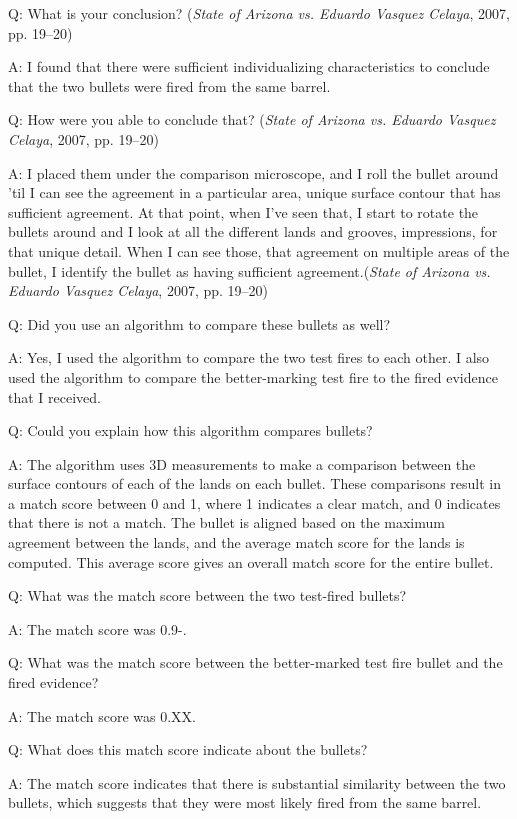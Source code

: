 \documentclass[print]{nuthesis}
\begin{document}
Q: What is your conclusion? (\emph{State of {Arizona} vs. Eduardo {Vasquez} {Celaya}}, 2007, pp. 19--20)

A: I found that there were sufficient individualizing characteristics to conclude that the two bullets were fired from the same barrel.

Q: How were you able to conclude that? (\emph{State of {Arizona} vs. Eduardo {Vasquez} {Celaya}}, 2007, pp. 19--20)

A: I placed them under the comparison microscope, and I roll the bullet around 'til I can see the agreement in a particular area, unique surface contour that has sufficient agreement.
At that point, when I've seen that, I start to rotate the bullets around and I look at all the different lands and grooves, impressions, for that unique detail.
When I can see those, that agreement on multiple areas of the bullet, I identify the bullet as having sufficient agreement.(\emph{State of {Arizona} vs. Eduardo {Vasquez} {Celaya}}, 2007, pp. 19--20)

Q: Did you use an algorithm to compare these bullets as well?

A: Yes, I used the algorithm to compare the two test fires to each other.
I also used the algorithm to compare the better-marking test fire to the fired evidence that I received.

Q: Could you explain how this algorithm compares bullets?

A: The algorithm uses 3D measurements to make a comparison between the surface contours of each of the lands on each bullet.
These comparisons result in a match score between 0 and 1, where 1 indicates a clear match, and 0 indicates that there is not a match.
The bullet is aligned based on the maximum agreement between the lands, and the average match score for the lands is computed.
This average score gives an overall match score for the entire bullet.

Q: What was the match score between the two test-fired bullets?

A: The match score was 0.9-.

Q: What was the match score between the better-marked test fire bullet and the fired evidence?

A: The match score was 0.XX.

Q: What does this match score indicate about the bullets?

A: The match score indicates that there is substantial similarity between the two bullets, which suggests that they were most likely fired from the same barrel.
\end{document}
